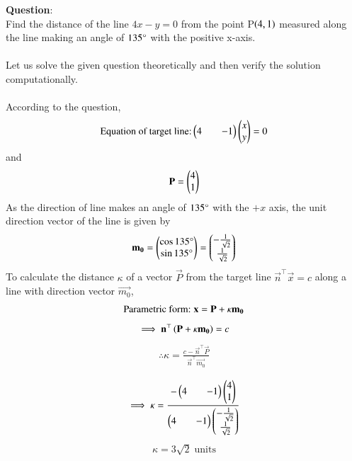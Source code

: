 \documentclass[journal]{IEEEtran}
\begin{document}
\textbf{Question}:\\
Find the distance of the line $4x-y=0$ from the point P$\brak{4,1}$ measured along the line making an angle of $135\degree$ with the positive x-axis.\\
\solution \\
Let us solve the given question theoretically and then verify the solution computationally.\\
\\
According to the question,\\
\begin{align}
    \text{Equation of target line:}\myvec{4&&-1}\myvec{x\\y}=0
\end{align}
and
\begin{align}
    \vec{P}=\myvec{4\\1}
\end{align}
As the direction of line makes an angle of $135\degree$ with the $+x$ axis, the unit direction vector of the line is given by
\begin{align}
    \vec{m_0}=\myvec{\cos{135\degree}\\\sin{135\degree}}=\myvec{-\frac{1}{\sqrt{2}}\\\frac{1}{\sqrt{2}}}
\end{align}
To calculate the distance $\kappa$ of a vector $\vec{P}$ from the target line $\vec{n}^{\top}\vec{x}=c$ along a line with direction vector $\vec{m_0}$,
\begin{align}
    \text{Parametric form:\;}\vec{x}=\vec{P}+\kappa\vec{m_0} 
\end{align}
\begin{align}
    \implies \vec{n}^{\top}\brak{\vec{P}+\kappa\vec{m_0}}=c
\end{align}
\begin{align}
    \therefore \kappa=\frac{c-\vec{n}^{\top}\vec{P}}{\vec{n}^{\top}\vec{m_0}}\\
\end{align}
\begin{align}
     \implies \kappa=\frac{-\myvec{4&&-1}\myvec{4\\1}}{\myvec{4&&-1}\myvec{-\frac{1}{\sqrt{2}}\\\frac{1}{\sqrt{2}}}}
\end{align}
\begin{align}
    \kappa=3\sqrt{2}\; \text{units}
\end{align}
\newpage
\vspace*{0.25cm}
\end{document}
